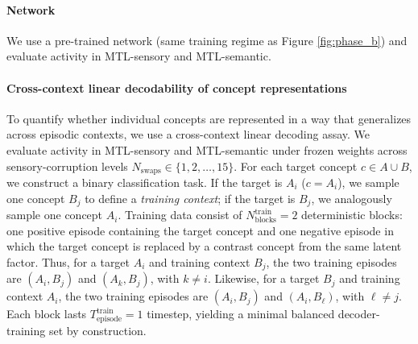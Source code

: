 \documentclass{article}
\begin{document}
\paragraph{Network}
We use a pre-trained network (same training regime as Figure \ref{fig:phase_b}) and evaluate activity in MTL-sensory and MTL-semantic.


\paragraph{Cross-context linear decodability of concept representations}
To quantify whether individual concepts are represented in a way that generalizes across episodic contexts, we use a cross-context linear decoding assay. We evaluate activity in MTL-sensory and MTL-semantic under frozen weights across sensory-corruption levels $N_{\textrm{swaps}}\in\{1,2,\ldots,15\}$.
\newline\newline
For each target concept $c\in A\cup B$, we construct a binary classification task. If the target is $A_i$ ($c=A_i$), we sample one concept $B_j$ to define a \textit{training context}; if the target is $B_j$, we analogously sample one concept $A_i$. Training data consist of $N_{\textrm{blocks}}^{\textrm{train}}=2$ deterministic blocks: one positive episode containing the target concept and one negative episode in which the target concept is replaced by a contrast concept from the same latent factor. Thus, for a target $A_i$ and training context $B_j$, the two training episodes are $(A_i,B_j)$ and $(A_k,B_j)$, with $k\neq i$. Likewise, for a target $B_j$ and training context $A_i$, the two training episodes are $(A_i,B_j)$ and $(A_i,B_\ell)$, with $\ell\neq j$. Each block lasts $T_{\textrm{episode}}^{\textrm{train}}=1$ timestep, yielding a minimal balanced decoder-training set by construction.
\end{document}
